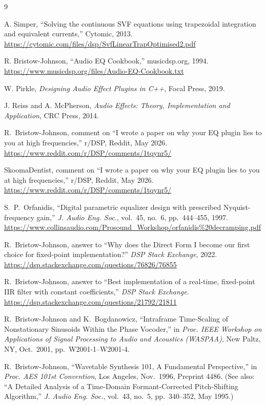 \documentclass[twocolumn]{article}
\begin{document}
\begin{thebibliography}{9}

A. Simper, ``Solving the continuous SVF equations using trapezoidal integration and equivalent currents,'' Cytomic, 2013.
\url{https://cytomic.com/files/dsp/SvfLinearTrapOptimised2.pdf}

R. Bristow-Johnson, ``Audio EQ Cookbook,'' musicdsp.org, 1994.
\url{https://www.musicdsp.org/files/Audio-EQ-Cookbook.txt}

W. Pirkle, \textit{Designing Audio Effect Plugins in C++}, Focal Press, 2019.

J. Reiss and A. McPherson, \textit{Audio Effects: Theory, Implementation and Application}, CRC Press, 2014.


R.~Bristow-Johnson, comment on ``I wrote a paper on why your EQ plugin lies to you at high frequencies,'' r/DSP, Reddit, May 2026.
\url{https://www.reddit.com/r/DSP/comments/1tqynr5/}

SkoomaDentist, comment on ``I wrote a paper on why your EQ plugin lies to you at high frequencies,'' r/DSP, Reddit, May 2026.
\url{https://www.reddit.com/r/DSP/comments/1tqynr5/}

S.~P.~Orfanidis, ``Digital parametric equalizer design with prescribed Nyquist-frequency gain,''
\textit{J. Audio Eng. Soc.}, vol.~45, no.~6, pp.~444--455, 1997.
\url{https://www.collinsaudio.com/Prosound_Workshop/orfanidis\%20decramping.pdf}

R.~Bristow-Johnson, answer to ``Why does the Direct Form I become our first choice for fixed-point implementation?''
\textit{DSP Stack Exchange}, 2022.
\url{https://dsp.stackexchange.com/questions/76826/76855}

R.~Bristow-Johnson, answer to ``Best implementation of a real-time, fixed-point IIR filter with constant coefficients,''
\textit{DSP Stack Exchange}.
\url{https://dsp.stackexchange.com/questions/21792/21811}

R.~Bristow-Johnson and K.~Bogdanowicz, ``Intraframe Time-Scaling of Nonstationary Sinusoids Within the Phase Vocoder,''
in \textit{Proc. IEEE Workshop on Applications of Signal Processing to Audio and Acoustics (WASPAA)},
New Paltz, NY, Oct.\ 2001, pp.~W2001-1--W2001-4.

R.~Bristow-Johnson, ``Wavetable Synthesis 101, A Fundamental Perspective,''
in \textit{Proc. AES 101st Convention}, Los Angeles, Nov.\ 1996, Preprint 4486.
(See also: ``A Detailed Analysis of a Time-Domain Formant-Corrected
Pitch-Shifting Algorithm,'' \textit{J. Audio Eng. Soc.}, vol.~43, no.~5,
pp.~340--352, May 1995.)


\end{thebibliography}
\end{document}
